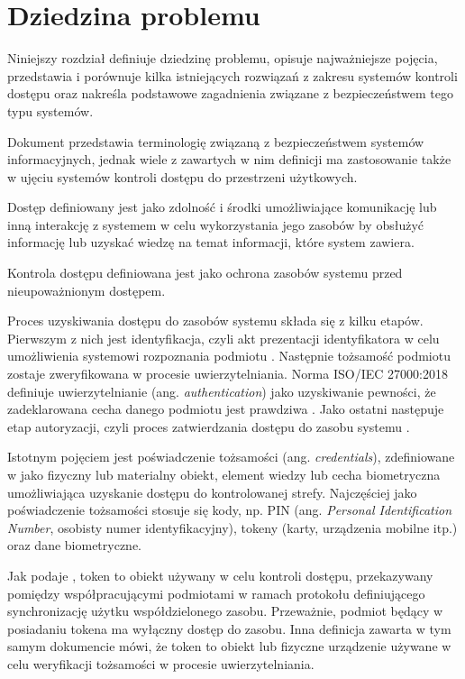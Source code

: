 \chapter{Dziedzina problemu}
\label{chap:problem-domain}

	Niniejszy rozdział definiuje dziedzinę problemu, opisuje najważniejsze pojęcia, przedstawia i porównuje kilka istniejących rozwiązań z zakresu systemów kontroli dostępu oraz nakreśla podstawowe zagadnienia związane z bezpieczeństwem tego typu systemów.


		Dokument \cite{rfc4949} przedstawia terminologię związaną z bezpieczeństwem systemów informacyjnych, jednak wiele z zawartych w nim definicji ma zastosowanie także w ujęciu systemów kontroli dostępu do przestrzeni użytkowych.

		Dostęp definiowany jest jako zdolność i środki umożliwiające komunikację lub inną interakcję z systemem w celu wykorzystania jego zasobów by obsłużyć informację lub uzyskać wiedzę na temat informacji, które system zawiera.

		Kontrola dostępu definiowana jest jako ochrona zasobów systemu przed nieupoważnionym dostępem.

		Proces uzyskiwania dostępu do zasobów systemu składa się z kilku etapów. Pierwszym z nich jest identyfikacja, czyli akt prezentacji identyfikatora w celu umożliwienia systemowi rozpoznania podmiotu \cite{rfc4949}. Następnie tożsamość podmiotu zostaje zweryfikowana w procesie uwierzytelniania. Norma ISO/IEC 27000:2018 definiuje uwierzytelnianie (ang. \textit{authentication}) jako uzyskiwanie pewności, że zadeklarowana cecha danego podmiotu jest prawdziwa \cite{iso27000}. Jako ostatni następuje etap autoryzacji, czyli proces zatwierdzania dostępu do zasobu systemu \cite{rfc4949}.

		Istotnym pojęciem jest poświadczenie tożsamości (ang. \textit{credentials}), zdefiniowane w \cite{bsia2016} jako fizyczny lub materialny obiekt, element wiedzy lub cecha biometryczna umożliwiająca uzyskanie dostępu do kontrolowanej strefy. Najczęściej jako poświadczenie tożsamości stosuje się kody, np. PIN (ang. \textit{Personal Identification Number}, osobisty numer identyfikacyjny), tokeny (karty, urządzenia mobilne itp.) oraz dane biometryczne.

		Jak podaje \cite{rfc4949}, token to obiekt używany w celu kontroli dostępu, przekazywany pomiędzy współpracującymi podmiotami w ramach protokołu definiującego synchronizację użytku współdzielonego zasobu. Przeważnie, podmiot będący w posiadaniu tokena ma wyłączny dostęp do zasobu. Inna definicja zawarta w tym samym dokumencie mówi, że token to obiekt lub fizyczne urządzenie używane w celu weryfikacji tożsamości w procesie uwierzytelniania.

